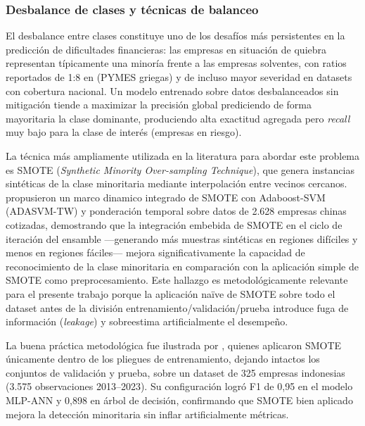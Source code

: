 \documentclass[12pt, letterpaper]{article}
\begin{document}
\subsubsection{Desbalance de clases y t\'ecnicas de balanceo}
\label{sec:desbalance}

El desbalance entre clases constituye uno de los desaf\'ios m\'as persistentes en la predicci\'on de dificultades financieras: las empresas en situaci\'on de quiebra representan t\'ipicamente una minor\'ia frente a las empresas solventes, con ratios reportados de 1:8 en \citet{Papadouli2024} (PYMES griegas) y de incluso mayor severidad en datasets con cobertura nacional. Un modelo entrenado sobre datos desbalanceados sin mitigaci\'on tiende a maximizar la precisi\'on global prediciendo de forma mayoritaria la clase dominante, produciendo alta exactitud agregada pero \textit{recall} muy bajo para la clase de inter\'es (empresas en riesgo).

La t\'ecnica m\'as ampliamente utilizada en la literatura para abordar este problema es SMOTE (\textit{Synthetic Minority Over-sampling Technique}), que genera instancias sint\'eticas de la clase minoritaria mediante interpolaci\'on entre vecinos cercanos. \citet{Sun2020} propusieron un marco dinamico integrado de SMOTE con Adaboost-SVM (ADASVM-TW) y ponderaci\'on temporal sobre datos de 2.628 empresas chinas cotizadas, demostrando que la integraci\'on embebida de SMOTE en el ciclo de iteraci\'on del ensamble ---generando m\'as muestras sint\'eticas en regiones dif\'iciles y menos en regiones f\'aciles--- mejora significativamente la capacidad de reconocimiento de la clase minoritaria en comparaci\'on con la aplicaci\'on simple de SMOTE como preprocesamiento. Este hallazgo es metodol\'ogicamente relevante para el presente trabajo porque la aplicaci\'on na\"ive de SMOTE sobre todo el dataset antes de la divisi\'on entrenamiento/validaci\'on/prueba introduce fuga de informaci\'on (\textit{leakage}) y sobreestima artificialmente el desempe\~no.

La buena pr\'actica metodol\'ogica fue ilustrada por \citet{Kristanti2025}, quienes aplicaron SMOTE \'unicamente dentro de los pliegues de entrenamiento, dejando intactos los conjuntos de validaci\'on y prueba, sobre un dataset de 325 empresas indonesias (3.575 observaciones 2013--2023). Su configuraci\'on logr\'o F1 de 0,95 en el modelo MLP-ANN y 0,898 en \'arbol de decisi\'on, confirmando que SMOTE bien aplicado mejora la detecci\'on minoritaria sin inflar artificialmente m\'etricas.
\end{document}

